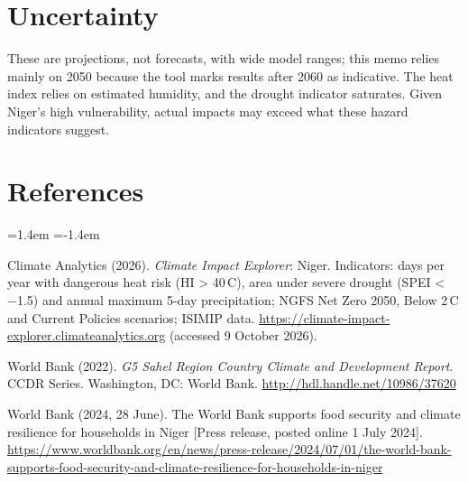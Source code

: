 \documentclass[12pt,a4paper]{article}
\newcommand{\degC}{\,\textdegree C}
\begin{document}
\section{Uncertainty}
These are projections, not forecasts, with wide model ranges; this memo relies mainly on 2050 because the tool
marks results after 2060 as indicative. The heat index relies on estimated humidity, and the drought indicator
saturates. Given Niger's high vulnerability, actual impacts may exceed what these hazard indicators suggest.

\clearpage
\section{References}
{\singlespacing
\begin{list}{}{\leftmargin=1.4em \itemindent=-1.4em \itemsep=6pt \parsep=0pt}
\item Climate Analytics (2026). \emph{Climate Impact Explorer}: Niger. Indicators: days per year with dangerous
      heat risk (HI > 40\degC), area under severe drought (SPEI < −1.5) and annual maximum 5-day precipitation;
      NGFS Net Zero 2050, Below 2\degC{} and Current Policies scenarios; ISIMIP data.
      \url{https://climate-impact-explorer.climateanalytics.org} (accessed 9 October 2026).
\item World Bank (2022). \emph{G5 Sahel Region Country Climate and Development Report}. CCDR Series.
      Washington, DC: World Bank. \url{http://hdl.handle.net/10986/37620}
\item World Bank (2024, 28 June). The World Bank supports food security and climate resilience for households
      in Niger [Press release, posted online 1 July 2024].
      \url{https://www.worldbank.org/en/news/press-release/2024/07/01/the-world-bank-supports-food-security-and-climate-resilience-for-households-in-niger}
\end{list}}
\end{document}
